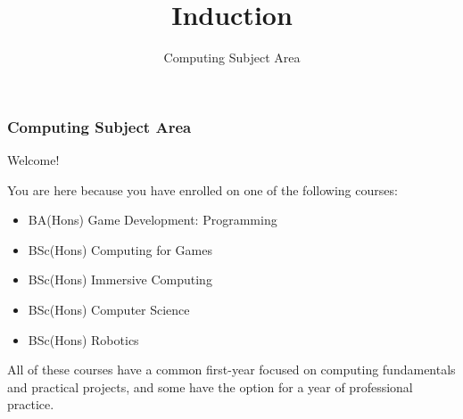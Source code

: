 \usepackage{../../beamerthemeFalmouthGamesAcademy}
\usepackage{multimedia}
\graphicspath{ {../../} }


\usepackage[normalem]{ulem}
\usepackage{wasysym}
\usepackage[T1]{fontenc}
\usepackage{pdfpages}

\usetikzlibrary{arrows,automata}





\title{Induction}
\subtitle{Computing Subject Area}

\frame{\titlepage} 

\begin{frame}
	\frametitle{Computing Subject Area}
	
	Welcome!
	
	\vspace{1em}
	
	You are here because you have enrolled on one of the following courses:
	
	\vspace{0.2em}
	
	\begin{itemize}
		\item BA(Hons) Game Development: Programming
		\item BSc(Hons) Computing for Games
		\item BSc(Hons) Immersive Computing
		\item BSc(Hons) Computer Science
		\item BSc(Hons) Robotics
	\end{itemize}
	
	\vspace{1em}
	
	All of these courses have a common first-year focused on computing fundamentals and practical projects, and some have the option for a year of professional practice.

\end{frame}

